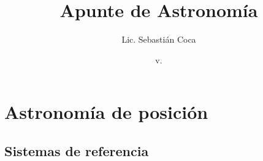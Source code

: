 %



%



\newcommand{\finej}{\hspace*{\fill}$\blacklozenge$}

\hyphenation{
	}



\title{Apunte de Astronomía}
\author{Lic. Sebastián Coca}
\date{\small v.\number\year\number\month\number\day}


\maketitle

\chapter{Astronomía de posición}

\section{Sistemas de referencia}
